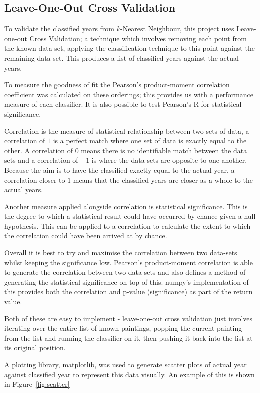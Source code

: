 \subsection{Leave-One-Out Cross Validation}
To validate the classified years from $k$-Nearest Neighbour, this project uses Leave-one-out Cross
Validation; a technique which involves removing each point from the known data set, applying the
classification technique to this point against the remaining data set. This produces a list of
classified years against the actual years.

To measure the goodness of fit the Pearson's product-moment correlation coefficient was 
calculated on these orderings; this provides us with a performance measure of each classifier. 
It is also possible to test Pearson's R for statistical significance.

Correlation is the measure of statistical relationship between two sets of data, a correlation of
$1$ is a perfect match where one set of data is exactly equal to the other. A correlation of $0$
means there is no identifiable match between the data sets and a correlation of $-1$ is where the
data sets are opposite to one another. Because the aim is to have the classified exactly equal to
the actual year, a correlation closer to $1$ means that the classified years are closer as a whole
to the actual years.

Another measure applied alongside correlation is statistical significance. This is the degree to
which a statistical result could have occurred by chance given a null hypothesis. This can be applied
to a correlation to calculate the extent to which the correlation could have been arrived at by 
chance.

Overall it is best to try and maximise the correlation between two data-sets whilst keeping the
significance low. Pearson's product-moment correlation is able to generate the correlation between
two data-sets and also defines a method of generating the statistical significance on top of this.
numpy's implementation of this provides both the correlation and p-value (significance) as part of
the return value.

Both of these are easy to implement - leave-one-out cross validation just involves iterating over
the entire list of known paintings, popping the current painting from the list and running the 
classifier on it, then pushing it back into the list at its original position.

A plotting library, matplotlib, was used to generate scatter plots of actual year against 
classified year to represent this data visually. An example of this is shown in Figure~\ref{fig:scatter}

